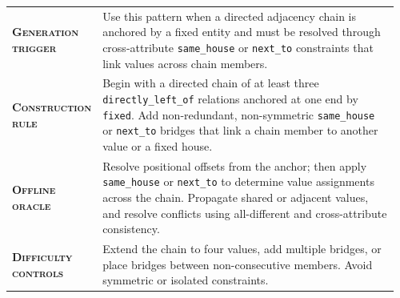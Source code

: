 \begin{table}[htbp]
\centering
\begin{minipage}{0.97\textwidth}
\raggedright
\small
\setlength{\tabcolsep}{3pt}
\renewcommand{\arraystretch}{1.16}
\vspace{0.35em}
\begin{tabular}{@{}>{\raggedright\arraybackslash\bfseries}p{0.17\linewidth} >{\raggedright\arraybackslash}p{0.79\linewidth}@{}}
    \textsc{Generation trigger} & Use this pattern when a directed adjacency chain is anchored by a fixed entity and must be resolved through cross-attribute \texttt{same\_house} or \texttt{next\_to} constraints that link values across chain members. \\
    \textsc{Construction rule} & Begin with a directed chain of at least three \texttt{directly\_left\_of} relations anchored at one end by \texttt{fixed}. Add non-redundant, non-symmetric \texttt{same\_house} or \texttt{next\_to} bridges that link a chain member to another value or a fixed house. \\
    \textsc{Offline oracle} & Resolve positional offsets from the anchor; then apply \texttt{same\_house} or \texttt{next\_to} to determine value assignments across the chain. Propagate shared or adjacent values, and resolve conflicts using all-different and cross-attribute consistency. \\
    \textsc{Difficulty controls} & Extend the chain to four values, add multiple bridges, or place bridges between non-consecutive members. Avoid symmetric or isolated constraints. \\
\end{tabular}
\vspace{0.45em}
\end{minipage}
\end{table}

